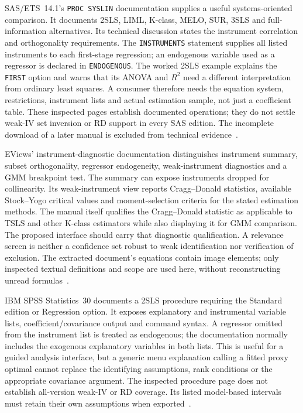 SAS/ETS~14.1's \texttt{PROC SYSLIN} documentation supplies a useful
systems-oriented comparison. It documents 2SLS, LIML, K-class, MELO,
SUR, 3SLS and full-information alternatives. Its technical discussion
states the instrument correlation and orthogonality requirements. The
\texttt{INSTRUMENTS} statement supplies all listed instruments to each
first-stage regression; an endogenous variable used as a regressor is
declared in \texttt{ENDOGENOUS}. The worked 2SLS example explains the
\texttt{FIRST} option and warns that its ANOVA and $R^2$ need a different
interpretation from ordinary least squares. A consumer therefore needs
the equation system, restrictions, instrument lists and actual estimation
sample, not just a coefficient table. These inspected pages establish
documented operations; they do not settle weak-IV set inversion or RD
support in every SAS edition. The incomplete download of a later manual
is excluded from technical evidence~\citep{exec13_ivrd_sas}.

EViews' instrument-diagnostic documentation distinguishes instrument
summary, subset orthogonality, regressor endogeneity, weak-instrument
diagnostics and a GMM breakpoint test. The summary can expose instruments
dropped for collinearity. Its weak-instrument view reports Cragg--Donald
statistics, available Stock--Yogo critical values and moment-selection
criteria for the stated estimation methods. The manual itself qualifies
the Cragg--Donald statistic as applicable to TSLS and other K-class
estimators while also displaying it for GMM comparison. The proposed
interface should carry that diagnostic qualification. A relevance screen
is neither a confidence set robust to weak identification nor verification
of exclusion. The extracted document's equations contain image elements;
only inspected textual definitions and scope are used here, without
reconstructing unread formulas~\citep{exec13_ivrd_eviews}.

IBM SPSS Statistics~30 documents a 2SLS procedure requiring the Standard
edition or Regression option. It exposes explanatory and instrumental
variable lists, coefficient/covariance output and command syntax. A
regressor omitted from the instrument list is treated as endogenous;
the documentation normally includes the exogenous explanatory variables
in both lists. This is useful for a guided analysis interface, but a
generic menu explanation calling a fitted proxy optimal cannot replace
the identifying assumptions, rank conditions or the appropriate covariance
argument. The inspected procedure page does not establish all-version
weak-IV or RD coverage. Its listed model-based intervals must retain
their own assumptions when exported~\citep{exec13_ivrd_spss}.

